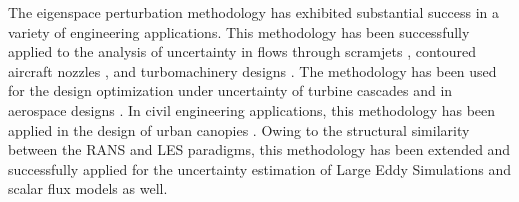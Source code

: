 The eigenspace perturbation methodology has exhibited substantial success in a variety of engineering applications. This methodology has been successfully applied to the analysis of uncertainty in flows through scramjets \cite{emory2011characterizing}, contoured aircraft nozzles \cite{mishra2019uncertainty,aiaajets, envelopingmodels, alonso2017scalable}, and turbomachinery designs \cite{emory2016uncertainty}. The methodology has been used for the design optimization under uncertainty of turbine cascades \cite{razaaly2019optimization} and in aerospace designs \cite{cook2019optimization}. In civil engineering applications, this methodology has been applied in the design of urban canopies \cite{garcia2014quantifying,ricci2015local}. Owing to the structural similarity between the RANS and LES paradigms, this methodology has been extended and successfully applied for the uncertainty estimation of Large Eddy Simulations and scalar flux models \cite{gorle2013framework} as well.

